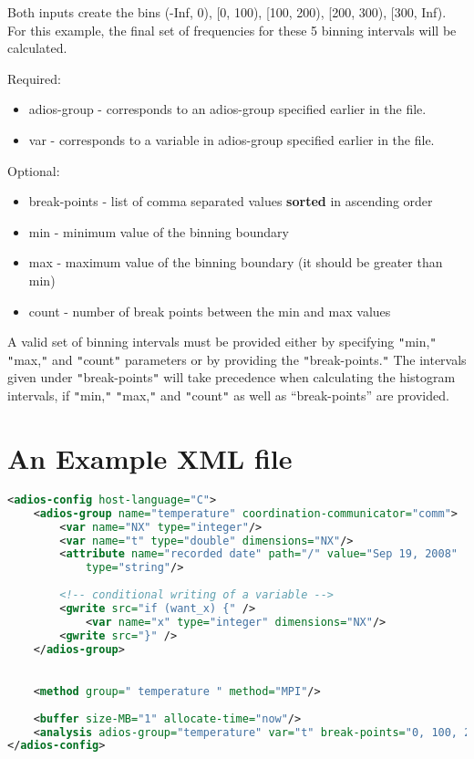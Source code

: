 Both inputs create the bins (-Inf, 0), [0, 100), [100, 200), [200, 300), [300, 
Inf). For this example, the final set of frequencies for these 5 binning intervals 
will be calculated.

Required:
\begin{itemize}
\item adios-group - corresponds to an adios-group specified earlier in the file.
\item var - corresponds to a variable in adios-group specified earlier in the file.
\end{itemize}

Optional:
\begin{itemize}
\item break-points - list of comma separated values \textbf{sorted} in ascending order
\item min  - minimum value of the binning boundary
\item max - maximum value of the binning boundary 
(it should be greater than min)
\item count - number of break points between the min and max values 
\end{itemize}

A valid set of binning intervals must be provided either by specifying \texttt{"}min,\texttt{"} 
\texttt{"}max,\texttt{"} and \texttt{"}count\texttt{"} parameters or by providing 
the \texttt{"}break-points.\texttt{"} The intervals given under \texttt{"}break-points\texttt{"} 
will take precedence when calculating the histogram intervals, if \texttt{"}min,\texttt{"} 
\texttt{"}max,\texttt{"} and \texttt{"}count\texttt{"} as well as ``break-points'' 
are provided.

\section{An Example XML file}

\begin{lstlisting}[language=XML, caption={Example XML file.}, label=list-example-xml]
<adios-config host-language="C">
    <adios-group name="temperature" coordination-communicator="comm">
        <var name="NX" type="integer"/>
        <var name="t" type="double" dimensions="NX"/>
        <attribute name="recorded date" path="/" value="Sep 19, 2008" 
            type="string"/> 
        
        <!-- conditional writing of a variable -->
        <gwrite src="if (want_x) {" />
            <var name="x" type="integer" dimensions="NX"/>
        <gwrite src="}" />
    </adios-group>

    
    <method group=" temperature " method="MPI"/>
    
    <buffer size-MB="1" allocate-time="now"/>
    <analysis adios-group="temperature" var="t" break-points="0, 100, 200, 300"/> 
</adios-config>
\end{lstlisting}

